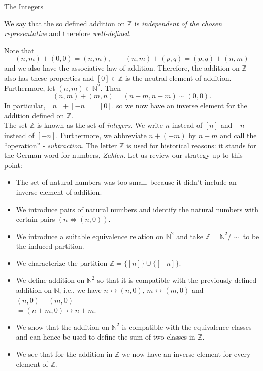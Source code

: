 \documentclass[smaller,hyperref={CJKbookmarks=true}]{beamer}
\newcommand{\N}{\mathbb{N}} \newcommand{\Z}{\mathbb{Z}} \newcommand{\Q}{\mathbb{Q}}
\begin{document}
\begin{frame}{The Integers}
\begin{spacing}{1.15}
We say that the so defined addition on $\Z$ is \emph{independent of the chosen representative} and therefore \emph{well-defined}.
\end{spacing}
\newpage
\begin{spacing}{1}
Note that
\[(n,m)+(0,0)=(n,m),\qquad (n,m)+(p,q)=(p,q)+(n,m)\]
and we also have the associative law of addition. Therefore, the addition on $\Z$ also has these properties and $[0]\in\Z$ is the neutral element of addition.\\[5pt]
Furthermore, let $(n,m)\in\N^2$. Then
\[(n,m)+(m,n)=(n+m,n+m)\sim(0,0).\]
In particular, $[n]+[-n]=[0]$. so we now have an inverse element for the addition defined on $\Z$.\\[5pt]
The set $\Z$ is known as the set of \emph{integers}. We write $n$ instead of $[n]$ and $-n$ instead of $[-n]$. Furthermore, we abbreviate $n+(-m)$ by $n-m$ and call the ``operation'' - \emph{subtraction}. The letter $\Z$ is used for historical reasons: it stands for the German word for numbers, \emph{Zahlen}.
\newpage
Let us review our strategy up to this point:
\begin{itemize}
  \item The set of natural numbers was too small, because it didn't include
      an inverse element of addition.
  \item We introduce pairs of natural numbers and identify the natural numbers with certain pairs $(n\Leftrightarrow(n,0))$.
  \item We introduce a suitable equivalence relation on $\N^2$ and take $\Z=\N^2/\sim$ to be the induced partition.
  \item We characterize the partition $\Z=\{[n]\}\cup\{[-n]\}$.
  \item We define addition on $\N^2$ so that it is compatible with the previously defined addition on $\N$, i.e., we have $n\leftrightarrow(n,0),\,m\leftrightarrow(m,0)$ and $(n,0)+(m,0)$\\ $=(n+m,0)\leftrightarrow n+m$.
  \item We show that the addition on $\N^2$ is compatible with the equivalence classes and can hence be used to define the sum of two classes in $\Z$.
  \item We see that for the addition in $\Z$ we now have an inverse element for every element of $\Z$.
\end{itemize}
\end{spacing}
\end{frame}
\end{document}
